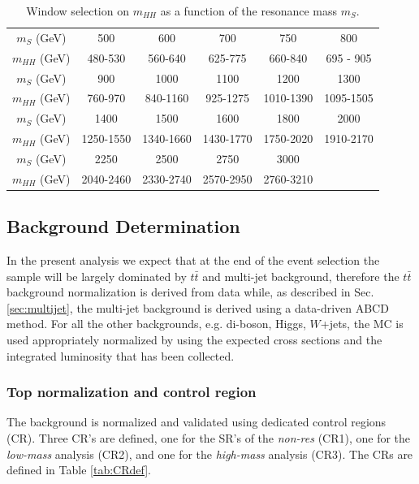 \begin{table}
\begin{center}
\begin{tabular}{c|c|c|c|c|c}
$m_{S}$ (GeV)      &   500   &   600   &   700   &   750   &   800 \\
$m_{HH}$  (GeV) & 480-530 & 560-640 & 625-775 & 660-840 & 695 - 905 \\ 
\hline 
$m_{S}$ (GeV)      &  900   &   1000  	   &  1100   	&  1200   		&   1300    \\
$m_{HH}$  (GeV) & 760-970	& 840-1160 & 925-1275	&1010-1390	&1095-1505  \\
\hline 
$m_{S}$ (GeV)      &   1400  		&  1500   		&  1600   		& 1800  		& 2000\\
$m_{HH}$  (GeV) &1250-1550	&1340-1660	&1430-1770	& 1750-2020 	& 1910-2170\\
\hline

\hline 
$m_{S}$ (GeV)      &   2250  		&  2500   		&  2750   		& 3000  		& \\
$m_{HH}$  (GeV) &2040-2460	&2330-2740	&2570-2950	& 2760-3210 	& \\
\end{tabular}
\caption[Window selection on ${m_HH}$]{Window selection on $m_{HH}$ as a function of the resonance mass
  $m_{S}$.}
\label{tab:mhh_sig_cuts}
\end{center}
\end{table}


\subsection{Background Determination}
In the present analysis we expect that at the end of the event selection the
sample will be largely dominated by $t \bar{t}$ and multi-jet background, therefore the $t\bar{t}$ background normalization
is derived from data while, as described in Sec. \ref{sec:multijet}, the multi-jet
background is derived using a data-driven ABCD method.
For all the other backgrounds, e.g. di-boson, Higgs, $W$+jets, the
MC is used appropriately normalized by using the expected cross sections and the
integrated luminosity that has been collected.

\subsubsection{Top normalization and control region}
\label{subsec:topCR}
The \ttbar background is normalized and validated using  dedicated
control regions (CR). Three CR's are defined, one for the SR's of the \emph{non-res} (CR1), one for the \emph{low-mass} analysis (CR2), and one for the \emph{high-mass} analysis (CR3).  The CRs are defined in Table \ref{tab:CRdef}.


